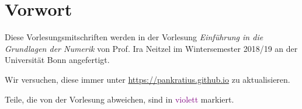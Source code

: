 \chapter*{Vorwort}
Diese Vorlesungsmitschriften werden in der Vorlesung \textit{Einführung in die Grundlagen der Numerik} von Prof. Ira Neitzel im Wintersemester 2018/19 an der Universität Bonn angefertigt.\par
Wir versuchen, diese immer unter \url{https://pankratius.github.io} zu aktualisieren.\par
Teile, die von der Vorlesung abweichen, sind in \textcolor{purple}{violett} markiert.

